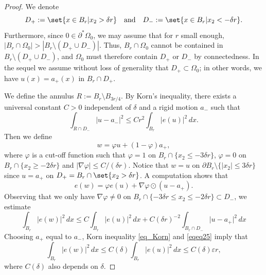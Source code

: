 \documentclass[12pt]{article}
\theoremstyle{definition}
\theoremstyle{remark}
\numberwithin{equation}{section}
\newcommand{\abs}[1]{\lvert #1 \rvert}
\newcommand{\D}{\nabla}
\begin{document}
\begin{proof}
    We denote 
    \begin{equation}
        D_+:=\set{x\in B_r | x_2 > \delta r}
        \quad \text{and} \quad
        D_-:=\set{x\in B_r | x_2 < -\delta r}.
    \end{equation}
    Furthermore, since $0 \in \partial^*\Omega_0$, we may assume that for $r$ small enough, $|B_r\cap \Omega_0|>
    |B_r \setminus (D_+ \cup D_-)|$. Thus, $B_r \cap \Omega_0$ cannot be contained in $B_r \setminus (D_+ \cup
    D_-)$, and $\Omega_0$ must therefore contain $D_+$ or $D_-$ by connectedness. In the sequel we assume without
    loss of generality that $D_+ \subset \Omega_0$; in other words, we have $u(x) = a_+(x)$ in $B_r\cap D_+$.

    We define the annulus $R:=B_r\setminus B_{3r/4}$. By Korn's inequality, there exists a universal constant $C>0$
    independent of $\delta$ and a rigid motion $a_-$ such that
    \begin{equation}\label{eq_Korn}
        \int_{R\cap D_-} |u-a_-|^2 \leq C r^2\int_{B_r}|e(u)|^2\,dx.
    \end{equation}
    Then we define 
    \begin{equation}
        w = \varphi u + (1-\varphi) a_+,
    \end{equation}
    where $\varphi$ is a cut-off function such that $\varphi=1$ on $B_r \cap \{x_2 \leq -3\delta r\}$, $\varphi=0$ on
    $B_r \cap \{x_2 \geq -2\delta r\}$ and $|\nabla \varphi|\leq C/(\delta r)$.  Notice that $w=u$ on $\partial B_r
    \setminus \{|x_2| \leq 3\delta r\}$ since $u = a_+$ on $D_+ = B_r \cap \set{x_2 > \delta r}$. A computation
    shows that 
    \begin{equation}\label{eq_ew}
        e(w) = \varphi e(u)+\nabla \varphi \odot (u - a_+).
    \end{equation}
    Observing that we only have $\nabla \varphi \ne 0$ on $B_r \cap \{-3\delta r \leq x_2 \leq -2\delta r\} \subset D_-$, we estimate 
    \begin{equation}
        \int_{B_r} \abs{e(w)}^2 \, dx \leq C \int_{B_r} \abs{e(u)}^2 \, dx + C (\delta r)^{-2} \int_{B_r \cap D_-} \abs{u - a_+}^2 \, dx
    \end{equation}
    Choosing $a_+$ equal to $a_-$, Korn inequality \eqref{eq_Korn} and \eqref{eqeq25} imply that
    \begin{equation}
        \label{eqeq26}
        \int_{B_r} \abs{e(w)}^2 \, dx \leq C(\delta) \int_{B_r} \abs{e(u)}^2 \, dx \leq C(\delta) \varepsilon r,
    \end{equation}
    where $C(\delta)$ also depends on $\delta$.


\end{proof}
\end{document}

